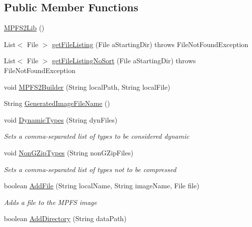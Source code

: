 \subsection*{Public Member Functions}
\begin{DoxyCompactItemize}
\item 
\hyperlink{class_microchip_m_p_f_s_1_1_m_p_f_s2_lib_a948e0db835b6a7068849fab0960c215d}{M\+P\+F\+S2\+Lib} ()
\item 
List$<$ File $>$ \hyperlink{class_microchip_m_p_f_s_1_1_m_p_f_s2_lib_a4ac4accd79e523bf52dcb374206d5fd3}{get\+File\+Listing} (File a\+Starting\+Dir)  throws File\+Not\+Found\+Exception 
\item 
List$<$ File $>$ \hyperlink{class_microchip_m_p_f_s_1_1_m_p_f_s2_lib_a4b6e1acaebf601bb38cc6357f11b3a4b}{get\+File\+Listing\+No\+Sort} (File a\+Starting\+Dir)  throws File\+Not\+Found\+Exception 
\item 
void \hyperlink{class_microchip_m_p_f_s_1_1_m_p_f_s2_lib_ad7979691d0503784932a8ffa7870755f}{M\+P\+F\+S2\+Builder} (String local\+Path, String local\+File)
\item 
String \hyperlink{class_microchip_m_p_f_s_1_1_m_p_f_s2_lib_a2e96d4b7c128a9ca970ee6918a8448cf}{Generated\+Image\+File\+Name} ()
\item 
void \hyperlink{class_microchip_m_p_f_s_1_1_m_p_f_s2_lib_a6a80c0a08b065cb2bad3aeab3a5ac01d}{Dynamic\+Types} (String dyn\+Files)
\begin{DoxyCompactList}\small\item\em Sets a comma-\/separated list of types to be considered dynamic \end{DoxyCompactList}\item 
void \hyperlink{class_microchip_m_p_f_s_1_1_m_p_f_s2_lib_a18fc099dc6b7c9aa568df00892e4d58d}{Non\+G\+Zip\+Types} (String non\+G\+Zip\+Files)
\begin{DoxyCompactList}\small\item\em Sets a comma-\/separated list of types not to be compressed \end{DoxyCompactList}\item 
boolean \hyperlink{class_microchip_m_p_f_s_1_1_m_p_f_s2_lib_a89c6850dc5e78502738cf3e6166b6f06}{Add\+File} (String local\+Name, String image\+Name, File file)
\begin{DoxyCompactList}\small\item\em Adds a file to the M\+P\+F\+S image \end{DoxyCompactList}\item 
boolean \hyperlink{class_microchip_m_p_f_s_1_1_m_p_f_s2_lib_afd4aae346b226f92cf8b7394bbe023de}{Add\+Directory} (String data\+Path)

\end{DoxyCompactItemize}
